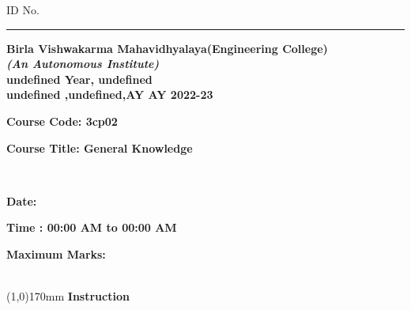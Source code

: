 \documentclass[addpoints,12pt]{exam}
\begin{document}
    \hspace{-7mm}ID No.\rule{20mm}{0.3mm}
    \begin{center}
 \textbf{Birla Vishwakarma Mahavidhyalaya(Engineering College)} \\
  \textbf{\textit{(An Autonomous Institute)}} \\
  \textbf{undefined Year, undefined} \\
  \textbf{undefined ,undefined,AY AY 2022-23} \\
  \vspace{4mm}
 
 
  \end{center}
 
  \hspace{-7mm}
  \parbox[t]{50mm}{\textbf{Course Code: 3cp02}}
  \parbox[t]{100mm}{\textbf{Course Title: General Knowledge}}\vspace{2mm}\\
  \parbox[t]{50mm}{\textbf{Date: }}
  \parbox[t]{75mm}{\textbf{Time : 00:00 AM to 00:00 AM}}
  \parbox[t]{50mm}{\textbf{Maximum Marks: }}\\
  \line(1,0){170mm} \vspace{2mm}
  \hspace{-6mm}\textbf{Instruction}

 
\end{document}
